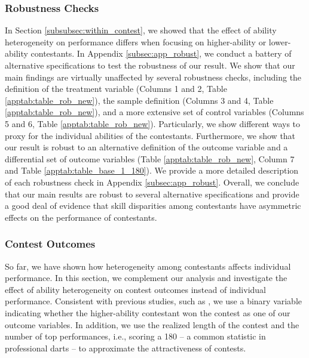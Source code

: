 \documentclass[11pt,a4paper]{article}
\begin{document}
\subsubsection{Robustness Checks} \label{subsec:robustnes}

In Section \ref{subsubsec:within_contest}, we showed that the effect of ability heterogeneity on performance differs when focusing on higher-ability or lower-ability contestants.
In Appendix \ref{subsec:app_robust}, we conduct a battery of alternative specifications to test the robustness of our result.
We show that our main findings are virtually unaffected by several robustness checks, including the definition of the treatment variable (Columns 1 and 2, Table \ref{apptab:table_rob_new}), the sample definition (Columns 3 and 4, Table \ref{apptab:table_rob_new}), and a more extensive set of control variables (Columns 5 and 6, Table \ref{apptab:table_rob_new}). Particularly, we show different ways to proxy for the individual abilities of the contestants. Furthermore, we show that our result is robust to an alternative definition of the outcome variable and a differential set of outcome variables (Table \ref{apptab:table_rob_new}, Column 7 and Table \ref{apptab:table_base_1_180}). We provide a more detailed description of each robustness check in Appendix \ref{subsec:app_robust}. Overall, we conclude that our main results are robust to several alternative specifications and provide a good deal of evidence that skill disparities among contestants have asymmetric effects on the performance of contestants. \par

\subsubsection{Contest Outcomes}\label{subsubsec:contest_outcomes}

So far, we have shown how heterogeneity among contestants affects individual performance. In this section, we complement our analysis and investigate the effect of ability heterogeneity on contest outcomes instead of individual performance. Consistent with previous studies, such as , we use a binary variable indicating whether the higher-ability contestant won the contest as one of our outcome variables. In addition, we use the realized length of the contest and the number of top performances, i.e., scoring a 180 -- a common statistic in professional darts -- to approximate the attractiveness of contests.\par
\end{document}
